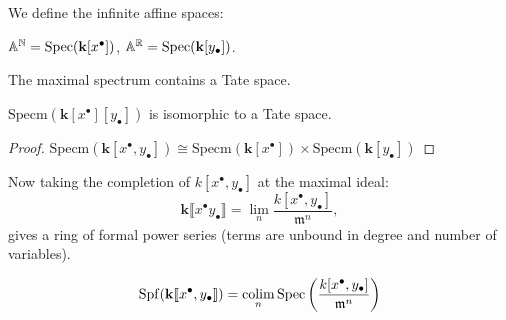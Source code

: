     We define the infinite affine spaces:
    \begin{defn}
    \( \mathbb{A}^{\mathbb{N}} =  \mathrm{Spec}(\mathbf{k}[x^{\bullet}]) \), \(\mathbb{A}^{\mathbb{R}} = \mathrm{Spec}(\mathbf{k}[y_{\bullet}])\).
    \end{defn}
    
    The maximal spectrum contains a Tate space. 
    
    
    \begin{lem}
    \(\mathrm{Specm}(\mathbf{k}[x^{\bullet}][ y_{\bullet}])\) is isomorphic to a Tate space. 
    \end{lem}
    \begin{proof}
    \( \mathrm{Specm}(\mathbf{k}[x^{\bullet}, y_{\bullet}]) \cong \mathrm{Specm}(\mathbf{k}[x^{\bullet}]) \times \mathrm{Specm}(\mathbf{k}[ y_{\bullet}]) \)
    \end{proof}
    
    Now taking the completion of \( k[x^{\bullet},y_{\bullet}] \) at the maximal ideal:
    \[  \mathbf{k}\lBrack x^{\bullet}  y_{\bullet} \rBrack = \lim_n  \frac{k[x^{\bullet}, y_{\bullet}]}{\mathfrak{m}^n},\]
    gives a ring of formal power series (terms are unbound in degree and number of variables).
    

    \begin{lem}
    \[  \mathrm{Spf}({\mathbf{k}[\![ x^\bullet, y_\bullet ]\!] }) = \operatorname*{colim}_n \mathrm{Spec}\left(\frac{k[x^{\bullet}, y_{\bullet}]}{\mathfrak{m}^n} \right)  \]
    \end{lem}
    

